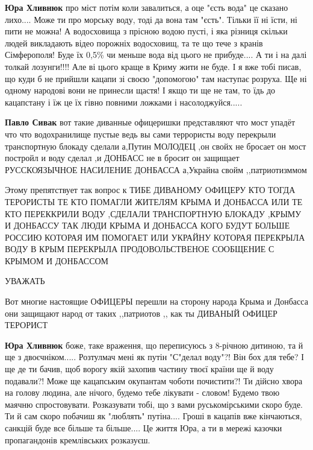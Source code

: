 \begin{itemize}
\begin{itemize}
\textbf{Юра Хливнюк} про міст потім коли завалиться, а оце "єсть вода" це
сказано лихо.... Може ти про морську воду, тоді да вона там "єсть". Тільки її
ні їсти, ні пити не можна! А водосховища з прісною водою пусті, і яка різниця
скільки людей викладають відео порожніх водосховищ, та те що тече з кранів
Сімферополя! Буде їх 0,5\% чи меньше вода від цього не прибуде.... А ти і на
далі толкай лозунги!!!! Але ві цього краще в Криму жити не буде. І я вже тобі
писав, що куди б не прийшли кацапи зі своєю "допомогою" там наступає розруха.
Ще ні одному народові вони не принесли щастя! І якщо ти ще не там, то їдь до
кацапстану і їж це їх гівно повними ложками і насолоджуйся.....

\textbf{Павло Сивак} вот такие диванные офицеришки представляют что мост упадёт
что что водохранилище пустые ведь вы сами террористы воду перекрыли
транспортную блокаду сделали а,Путин МОЛОДЕЦ ,он свойх не бросает он мост
постройл и воду сделал ,и ДОНБАСС не в бросит он защищает РУССКОЯЗЫЧНОЕ
НАСИЛЕНИЕ ДОНБАССА а,Украйна свойм ,,патриотизммом


Этому препятствует так вопрос к ТИБЕ ДИВАНОМУ ОФИЦЕРУ КТО ТОГДА ТЕРОРИСТЫ ТЕ
КТО ПОМАГЛИ ЖИТЕЛЯМ КРЫМА И ДОНБАССА ИЛИ ТЕ КТО ПЕРЕККРИЛИ ВОДУ ,СДЕЛАЛИ
ТРАНСПОРТНУЮ БЛОКАДУ ,КРЫМУ И ДОНБАССУ ТАК ЛЮДИ КРЫМА И ДОНБАССА КОГО БУДУТ
БОЛЬШЕ РОССИЮ КОТОРАЯ ИМ ПОМОГАЕТ ИЛИ УКРАЙНУ КОТОРАЯ ПЕРЕКРЫЛА ВОДУ В КРЫМ
ПЕРЕКРЫЛА ПРОДОВОЛЬСТВЕНОЕ СООБЩЕНИЕ С КРЫМОМ И ДОНБАССОМ



УВАЖАТЬ


Вот многие настоящие ОФИЦЕРЫ перешли на сторону народа Крыма и Донбасса они
защищают народ от таких ,,патриотов ,, как ты ДИВАНЫЙ ОФИЦЕР ТЕРОРИСТ



\textbf{Юра Хливнюк} боже, таке враження, що переписуюсь з 8-річною дитиною, та
й ще з двоєчніком..... Розтулмач мені як путін "С"делал воду"?! Він бох для
тебе? І ще де ти бачив, щоб ворогу якій захопив частину твоєї країни ще й воду
подавали?! Може ще кацапським окупантам чоботи почистити?! Ти дійсно хвора на
голову людина, але нічого, будемо тебе лікувати - словом! Будемо твою маячню
спростовувати. Розказувати тобі, що з вами руськомірськими скоро буде. Ти й сам
скоро побачиш як "люблять" путіна.... Гроші в кацапів вже кінчаються, санкцій
буде все більше та більше.... Це життя Юра, а ти в мережі казочки пропагандонів
кремлівських розказуєш.


\end{itemize}
\end{itemize}
